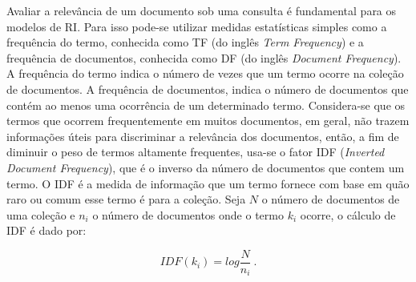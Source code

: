 

% 
% 
% 




Avaliar a relevância de um documento sob uma consulta é fundamental para os modelos de RI. Para isso pode-se utilizar medidas estatísticas simples como a frequência do termo, conhecida como TF (do inglês \textit{Term Frequency}) e a frequência de documentos, conhecida como DF (do inglês \textit{Document Frequency}). A frequência do termo indica o número de vezes que um termo ocorre na coleção de documentos. A frequência de documentos, indica o número de documentos que contém ao menos uma ocorrência de um determinado termo. Considera-se que os termos que ocorrem frequentemente em muitos documentos, em geral, não trazem informações úteis para discriminar a relevância dos documentos, então, a fim de diminuir o peso de termos altamente frequentes, usa-se o fator IDF (\textit{Inverted Document Frequency}), que é o inverso da número de documentos que contem um termo. O IDF é a medida de informação que um termo fornece com base em quão raro ou comum esse termo é para a coleção. Seja $N$ o número de documentos de uma coleção e $n_i$ o número de documentos onde o termo $k_i$ ocorre, o cálculo de IDF é dado por: 

	\begin{equation}
		IDF(k_i) = log\frac{N}{n_i}~.
		\label{equ:IDF}
	\end{equation}

